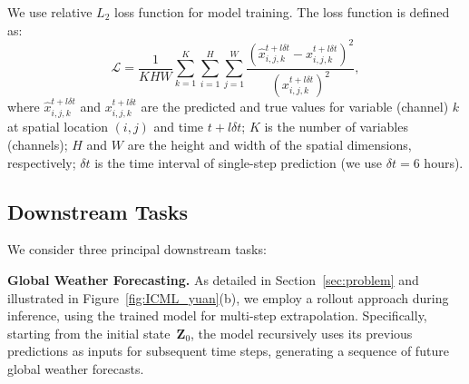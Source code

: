 We use relative $L_2$ loss function for model training. The loss function is defined as:
\begin{equation}
\mathcal{L} = \frac{1}{K H W} \sum_{k=1}^K  \sum_{i=1}^H \sum_{j=1}^W \frac{\left( \hat{x}_{i, j, k}^{t + l \delta t} - x_{i, j, k}^{t + l \delta t} \right)^2}{\left( x_{i, j, k}^{t + l \delta t} \right)^2},
\end{equation}
where $\hat{x}_{i, j, k}^{t + l \delta t}$ and $x_{i, j, k}^{t + l \delta t}$ are the predicted and true values for variable (channel) $k$ at spatial location $(i, j)$ and time $t + l \delta t$; $K$ is the number of variables (channels); $H$ and $W$ are the height and width of the spatial dimensions, respectively; $\delta t$ is the time interval of single-step prediction (we use $\delta t = 6$ hours).

\subsection{Downstream Tasks}

We consider three principal downstream tasks:

\textbf{Global Weather Forecasting.} As detailed in Section~\ref{sec:problem} and illustrated in Figure~\ref{fig:ICML_yuan}(b), we employ a rollout approach during inference, using the trained model for multi-step extrapolation. Specifically, starting from the initial state~$\mathbf{Z}_0$, the model recursively uses its previous predictions as inputs for subsequent time steps, generating a sequence of future global weather forecasts.

